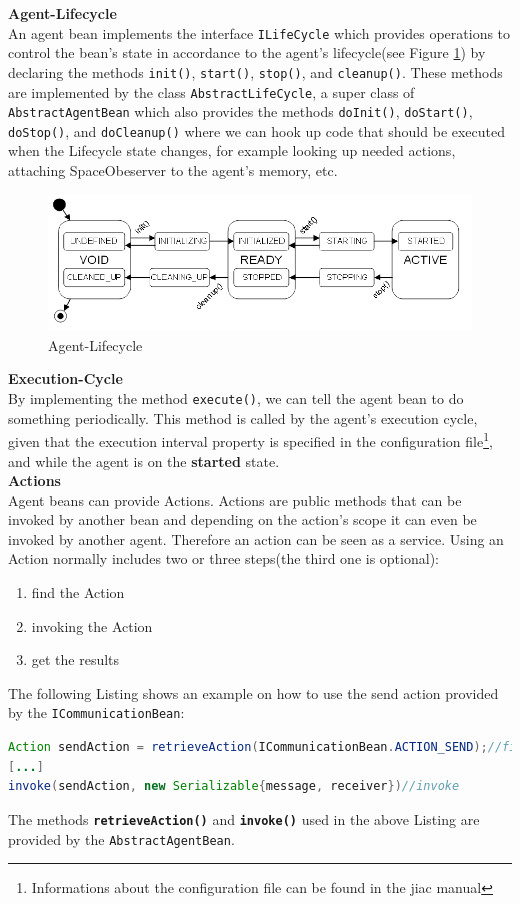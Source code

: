 \textbf{Agent-Lifecycle}\\
An agent bean implements the interface \texttt{ILifeCycle} which provides operations to control the bean's state in accordance to the agent's lifecycle(see Figure \ref{fig:lifecycle}) by declaring the methods \texttt{init()}, \texttt{start()}, \texttt{stop()}, and \texttt{cleanup()}. These methods are implemented by the class \texttt{AbstractLifeCycle}, a super class of \texttt{AbstractAgentBean} which also provides the methods \texttt{doInit()}, \texttt{doStart()}, \texttt{doStop()}, and \texttt{doCleanup()} where we can hook up code that should be executed when the Lifecycle state changes, for example looking up needed actions, attaching SpaceObeserver to the agent's memory, etc.
\begin{figure}
	\centering
		\includegraphics[width=1.00\textwidth]{images/lifecycle.png}
		\caption{Agent-Lifecycle \cite{JIACMAN10}}
		\label{fig:lifecycle}
\end{figure}

\textbf{Execution-Cycle}\\
By implementing the method \texttt{execute()}, we can tell the agent bean to do something periodically. This method is called by the agent's execution cycle, given that the execution interval property is specified in the configuration file\footnote{Informations about the configuration file can be found in the jiac manual\cite{JIACMAN10}}, and while the agent is on the \textbf{started} state.\\

\textbf{Actions}\\
Agent beans can provide Actions. Actions are public methods that can be invoked by another bean and depending on the action's scope it can even be invoked by another agent. Therefore an action can be seen as a service. 
Using an Action normally includes two or three steps(the third one is optional):
\begin{enumerate}
	\item find the Action
	\item invoking the Action
	\item get the results
\end{enumerate}
The following Listing shows an example on how to use the send action provided by the \texttt{ICommunicationBean}:
\begin{lstlisting}[language = Java, caption = Using an Action]
Action sendAction = retrieveAction(ICommunicationBean.ACTION_SEND);//find action
[...]
invoke(sendAction, new Serializable{message, receiver})//invoke
\end{lstlisting}
The methods \textbf{\texttt{retrieveAction()}} and \textbf{\texttt{invoke()}} used in the above Listing are provided  by the \texttt{AbstractAgentBean}.\\

